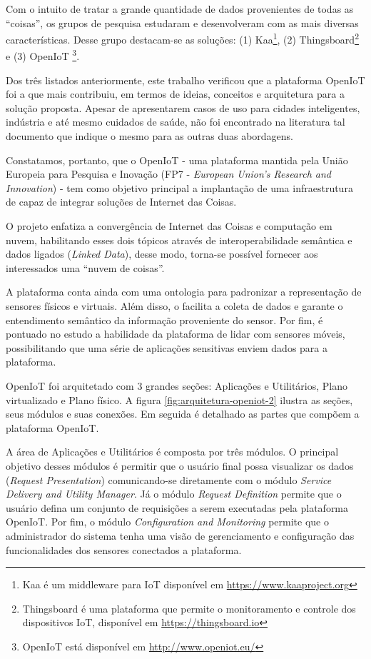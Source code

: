 Com o intuito de tratar a grande quantidade de dados provenientes de todas as
``coisas'', os grupos de pesquisa estudaram e desenvolveram \middlewares[] com as
mais diversas características. Desse grupo destacam-se as soluções: (1) Kaa\footnote{Kaa é um
middleware para IoT disponível em \url{https://www.kaaproject.org}},
(2) Thingsboard\footnote{Thingsboard é uma plataforma que permite o monitoramento 
e controle dos dispositivos IoT, disponível em \url{https://thingsboard.io}} e (3) OpenIoT
\footnote{OpenIoT está disponível em \url{http://www.openiot.eu/}}.

Dos três listados anteriormente, este trabalho verificou que a plataforma
OpenIoT foi a que mais contribuiu, em termos de ideias, conceitos e arquitetura
para a solução proposta. Apesar de apresentarem casos de uso para cidades
inteligentes, indústria e até mesmo cuidados de saúde, não foi encontrado na
literatura tal documento que indique o mesmo para as outras duas abordagens.

Constatamos, portanto, que o OpenIoT - uma plataforma mantida pela União
Europeia para Pesquisa e Inovação (FP7 - \textit{European Union's Research and
Innovation}) - tem como objetivo principal a implantação de uma infraestrutura
de \middleware[] capaz de integrar soluções de Internet das Coisas.

O projeto enfatiza a convergência de Internet das Coisas e computação em nuvem,
habilitando esses dois tópicos através de interoperabilidade semântica e dados
ligados (\textit{Linked Data}), desse modo, torna-se possível fornecer aos interessados
uma ``nuvem de coisas''.

A plataforma conta ainda com uma ontologia para padronizar a representação de
sensores físicos e virtuais. Além disso, o \middleware[] facilita a coleta de
dados e garante o entendimento semântico da informação proveniente do sensor.
Por fim, é pontuado no estudo a habilidade da plataforma de lidar com sensores
móveis, possibilitando que uma série de aplicações sensitivas enviem dados para
a plataforma.

OpenIoT foi arquitetado com 3 grandes seções: Aplicações e Utilitários, Plano
virtualizado e Plano físico. A figura \ref{fig:arquitetura-openiot-2} ilustra as
seções, seus módulos e suas conexões. Em seguida é detalhado as partes que
compõem a plataforma OpenIoT.

    
A área de Aplicações e Utilitários é composta por três módulos. O principal
objetivo desses módulos é permitir que o usuário final possa visualizar os
dados (\textit{Request Presentation}) comunicando-se diretamente com o módulo
\textit{Service Delivery and Utility Manager}.  Já o módulo \textit{Request
Definition} permite que o usuário defina um conjunto de requisições a serem
executadas pela plataforma OpenIoT. Por fim, o módulo \textit{Configuration and
Monitoring} permite que o administrador do sistema tenha uma visão de
gerenciamento e configuração das funcionalidades dos sensores conectados a
plataforma. 

